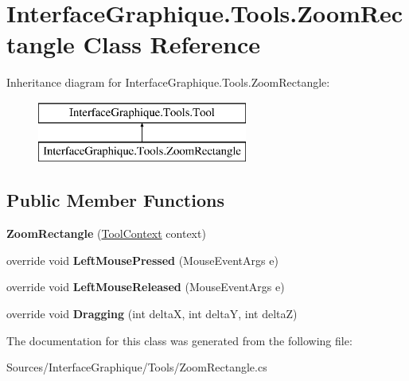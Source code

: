 \hypertarget{class_interface_graphique_1_1_tools_1_1_zoom_rectangle}{}\section{Interface\+Graphique.\+Tools.\+Zoom\+Rectangle Class Reference}
\label{class_interface_graphique_1_1_tools_1_1_zoom_rectangle}
Inheritance diagram for Interface\+Graphique.\+Tools.\+Zoom\+Rectangle\+:\begin{figure}[H]
\begin{center}
\leavevmode
\includegraphics[height=2.000000cm]{class_interface_graphique_1_1_tools_1_1_zoom_rectangle}
\end{center}
\end{figure}
\subsection*{Public Member Functions}
\begin{DoxyCompactItemize}
\item 
\hypertarget{class_interface_graphique_1_1_tools_1_1_zoom_rectangle_a0e1a1918f55eab0b9762c1e062c2b5b3}{}{\bfseries Zoom\+Rectangle} (\hyperlink{class_interface_graphique_1_1_tools_1_1_tool_context}{Tool\+Context} context)\label{class_interface_graphique_1_1_tools_1_1_zoom_rectangle_a0e1a1918f55eab0b9762c1e062c2b5b3}

\item 
\hypertarget{class_interface_graphique_1_1_tools_1_1_zoom_rectangle_aea89e1a6d0043a6256b58d14e68331c6}{}override void {\bfseries Left\+Mouse\+Pressed} (Mouse\+Event\+Args e)\label{class_interface_graphique_1_1_tools_1_1_zoom_rectangle_aea89e1a6d0043a6256b58d14e68331c6}

\item 
\hypertarget{class_interface_graphique_1_1_tools_1_1_zoom_rectangle_a1b7f36743fbfc90c84ee0f32f333ca63}{}override void {\bfseries Left\+Mouse\+Released} (Mouse\+Event\+Args e)\label{class_interface_graphique_1_1_tools_1_1_zoom_rectangle_a1b7f36743fbfc90c84ee0f32f333ca63}

\item 
\hypertarget{class_interface_graphique_1_1_tools_1_1_zoom_rectangle_a8af5ed7644c22e033f4ad438f3221854}{}override void {\bfseries Dragging} (int delta\+X, int delta\+Y, int delta\+Z)\label{class_interface_graphique_1_1_tools_1_1_zoom_rectangle_a8af5ed7644c22e033f4ad438f3221854}

\end{DoxyCompactItemize}


The documentation for this class was generated from the following file\+:\begin{DoxyCompactItemize}
\item 
Sources/\+Interface\+Graphique/\+Tools/Zoom\+Rectangle.\+cs\end{DoxyCompactItemize}
